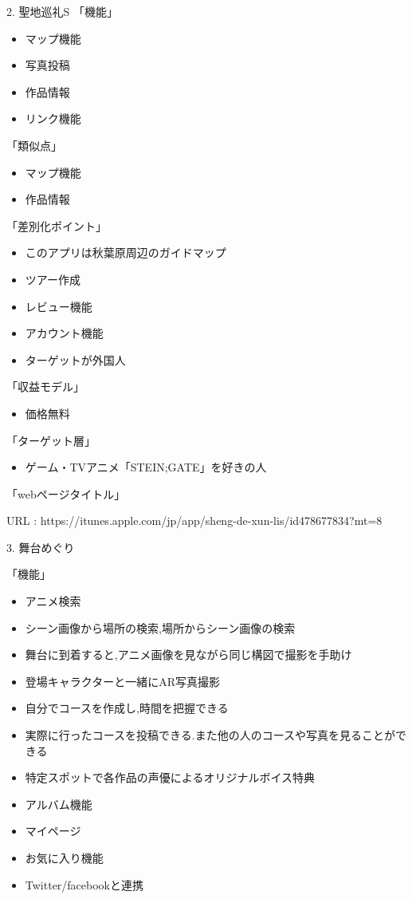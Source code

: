 \par 2. 聖地巡礼S
「機能」
\begin{itemize}
\item マップ機能
\item 写真投稿
\item 作品情報
\item リンク機能
\end{itemize}
「類似点」
\begin{itemize}
\item マップ機能
\item 作品情報
\end{itemize}
「差別化ポイント」
\begin{itemize}
\item このアプリは秋葉原周辺のガイドマップ
\item ツアー作成
\item レビュー機能
\item アカウント機能
\item ターゲットが外国人
\end{itemize}
「収益モデル」
\begin{itemize}
\item 価格無料
\end{itemize}
「ターゲット層」
\begin{itemize}
\item ゲーム・TVアニメ「STEIN;GATE」を好きの人
\end{itemize}
「webページタイトル」
\par URL : https://itunes.apple.com/jp/app/sheng-de-xun-lis/id478677834?mt=8
\\
\par 3. 舞台めぐり
\par 「機能」
\begin{itemize}
\item アニメ検索
\item シーン画像から場所の検索,場所からシーン画像の検索
\item 舞台に到着すると,アニメ画像を見ながら同じ構図で撮影を手助け
\item 登場キャラクターと一緒にAR写真撮影
\item 自分でコースを作成し,時間を把握できる
\item 実際に行ったコースを投稿できる.また他の人のコースや写真を見ることができる
\item 特定スポットで各作品の声優によるオリジナルボイス特典
\item アルバム機能
\item マイページ
\item お気に入り機能
\item Twitter/facebookと連携
\end{itemize}
